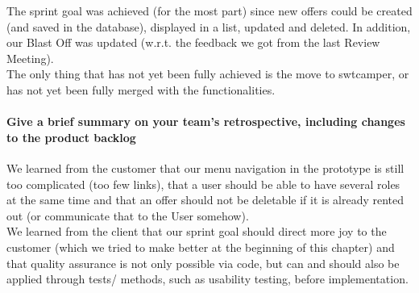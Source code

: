The sprint goal was achieved (for the most part) since new offers could be created (and saved in the database), displayed in a list, updated and deleted. In addition, our Blast Off was updated (w.r.t. the feedback we got from the last Review Meeting). \\
The only thing that has not yet been fully achieved is the move to swtcamper, or has not yet been fully merged with the functionalities.

\paragraph{Give a brief summary on your team's retrospective, including changes to the product backlog}

We learned from the customer that our menu navigation in the prototype is still too complicated (too few links), that a user should be able to have several roles at the same time and that an offer should not be deletable if it is already rented out (or communicate that to the User somehow). \\
We learned from the client that our sprint goal should direct more joy to the customer (which we tried to make better at the beginning of this chapter) and that quality assurance is not only possible via code, but can and should also be applied through tests/ methods, such as usability testing, before implementation.